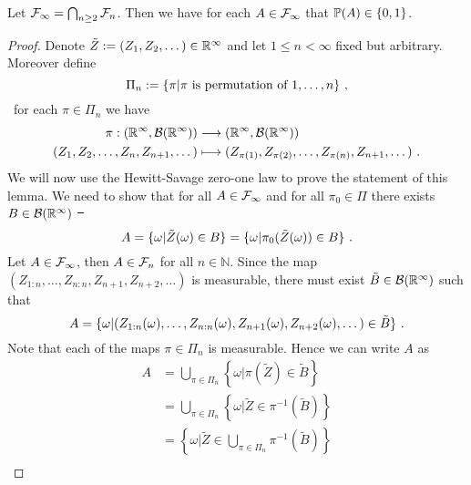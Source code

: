 \begin{lemma} \label{lem:hewitt_savage}
	Let $\F_\infty = \bigcap_{n\geq 2} \F_n$. Then we have for each $A\in \F_\infty$ that $\P(A)\in \{0,1\}$.
	\begin{proof}
		Denote $\tilde{Z}:=(Z_1, Z_2,\dots)\in\R^\infty$ and let $1\leq n<\infty$ fixed but arbitrary. Moreover define 
		\begin{equation*}
		\Pi_n := \{\pi | \pi \textrm{ is permutation of } 1,\dots, n\} \mcomma
		\end{equation*}	
		\ie\ for each $\pi\in \Pi_n$ we have
		\begin{align*}
		\pi: (\R^\infty, \mathcal{B}(\R^\infty)) &\longrightarrow (\R^\infty, \mathcal{B}(\R^\infty))\\
		(Z_1, Z_2,\dots,Z_n, Z_{n+1}, \dots) &\longmapsto (Z_{\pi(1)}, Z_{\pi(2)},\dots,Z_{\pi(n)}, Z_{n+1}, \dots)\mdot
		\end{align*}
		We will now use the Hewitt-Savage zero-one law to prove the statement of this lemma. We need to show that for all $A\in\F_\infty$ and for all $\pi_0\in\Pi$ there exists $B\in\mathcal{B}(\R^\infty)$ \st\ 
		\begin{equation}
		A = \{\omega| \tilde{Z}(\omega) \in B\} = \{\omega| \pi_0(\tilde{Z}(\omega)) \in B\} \mdot
		\label{eq:hewitt_savage}
		\end{equation} 	
		Let $A\in\F_\infty$, then $A\in\F_n$ for all $n\in\mathbb{N}$. Since the map $(Z_{1:n}, \dots, Z_{n:n}, Z_{n+1}, Z_{n+2}, \dots)$ is measurable, there must exist $\tilde{B}\in\mathcal{B}(\R^\infty)$ such that
		\begin{equation*}
		A = \{\omega | (Z_{1:n}(\omega), \dots, Z_{n:n}(\omega), Z_{n+1}(\omega), Z_{n+2}(\omega), \dots) \in \tilde{B}\}\mdot 
		\label{eq:A_Z_inv}
		\end{equation*}
		Note that each of the maps $\pi\in\Pi_n$ is measurable. Hence we can write $A$ as
		\begin{align*}
		A &= \bigcup\limits_{\pi\in\Pi_n}\left \{\omega | \pi(\tilde{Z}) \in \tilde{B}\right\}\\
		&=  \bigcup\limits_{\pi\in\Pi_n} \left\{\omega | \tilde{Z} \in \pi^{-1}(\tilde{B})\right\}\\
		&=  \left\{\omega | \tilde{Z} \in \bigcup\limits_{\pi\in\Pi_n}\pi^{-1}(\tilde{B})\right\}\\

\end{align*}
\end{proof}
\end{lemma}
